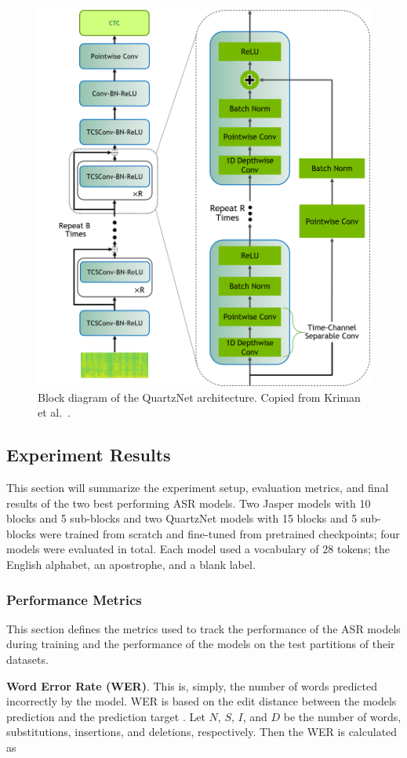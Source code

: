 \documentclass[12pt]{article}
\begin{document}
\begin{figure}
    \centering
    \includegraphics[width=0.5\linewidth]{figures/quartz_vertical.png}
    \caption{Block diagram of the QuartzNet architecture. Copied from Kriman et al.~\cite{kriman_quartznet_2020}.}
    \label{fig:quartznet}
\end{figure}

\subsection{Experiment Results}
This section will summarize the experiment setup, evaluation metrics, and final results of the two best performing ASR models. Two Jasper models with 10
blocks and 5 sub-blocks and two QuartzNet models with 15 blocks and 5 sub-blocks were trained from scratch and fine-tuned from pretrained
checkpoints; four models were evaluated in total. Each model used a vocabulary of 28 tokens; the English alphabet, an apostrophe, and a blank label.

\subsubsection{Performance Metrics}\label{sec:asr_performance_metrics}
This section defines the metrics used to track the performance of the ASR models during training and the performance of the models on the test
partitions of their datasets.

\textbf{Word Error Rate (WER)}. This is, simply, the number of words predicted incorrectly by the model. WER is based on the edit distance between the
models prediction and the prediction target \cite{hunt_figures_1990}. Let $N$, $S$, $I$, and $D$ be the number of words, substitutions, insertions,
and deletions, respectively. Then the WER is calculated as
\end{document}
